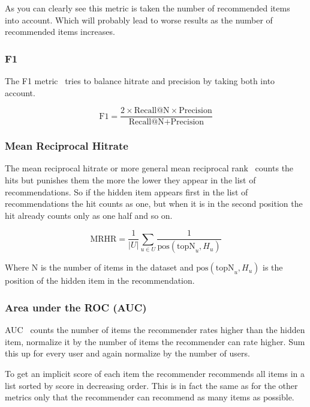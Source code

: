 As you can clearly see this metric is taken the number of recommended
items into account. Which will probably lead to worse results as the
number of recommended items increases.


\subsubsection{F1}

The F1 metric~\cite{Sarwar00applicationof} tries to balance hitrate and precision
by taking both into account.

\begin{equation}
\text{F1}=\frac{2 \times \text{Recall@N} \times \text{Precision}}{\text{Recall@N} + \text{Precision}}
\end{equation}


\subsubsection{Mean Reciprocal Hitrate}

The mean reciprocal hitrate or more general mean reciprocal
rank~\cite{DBLP:conf/icdm/NingK11} counts the hits but punishes them the more the lower they
appear in the list of recommendations. So if the hidden item appears
first in the list of recommendations the hit counts as one, but when
it is in the second position the hit already counts only as one half
and so on.

\begin{equation}
\text{MRHR}=\frac{1}{|U|} \sum_{u \in U} \frac{1}{\text{pos}(\text{topN}_{u},H_{u})}
\end{equation}

Where N is the number of items in the dataset and \(\text{pos}(\text{topN}_{u},H_{u})\)
is the position of the hidden item in the recommendation.


\subsubsection{Area under the ROC (AUC)}

AUC~\cite{Rendle:2009:BBP:1795114.1795167} counts the number of items the recommender rates
higher than the hidden item, normalize it by the number of items the
recommender can rate higher. Sum this up for every user and again
normalize by the number of users.

To get an implicit score of each item the recommender recommends all
items in a list sorted by score in decreasing order. This is in fact the same
as for the other metrics only that the recommender can recommend as
many items as possible.


